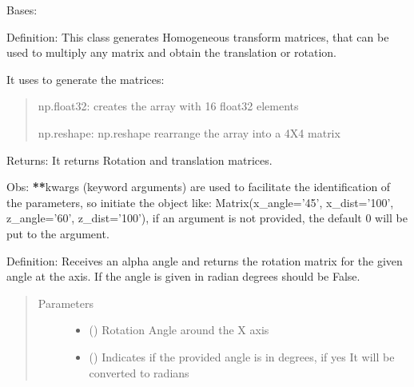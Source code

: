 \documentclass[letterpaper,10pt,english,openany,oneside]{sphinxmanual}
\begin{document}
\begin{fulllineitems}
\label{\detokenize{MatrixManipulation:MatrixManipulation.Matrix}}
Bases: 

Definition: This class generates Homogeneous transform matrices,
that can be used to multiply any matrix and obtain the translation or rotation.

It uses  to generate the matrices:
\begin{quote}

np.float32: creates the array with 16 float32 elements

np.reshape: np.reshape rearrange the array into a 4X4 matrix
\end{quote}

Returns: It returns Rotation and translation matrices.

Obs: {\color{red}\bfseries{}**}kwargs (keyword arguments) are used to facilitate the identification of the parameters, so initiate the
object
like: Matrix(x\_angle=’45’, x\_dist=’100’, z\_angle=’60’, z\_dist=’100’), if an argument is not provided,
the default 0 will be put to the argument.

\begin{fulllineitems}
\label{\detokenize{MatrixManipulation:MatrixManipulation.Matrix.rot_x}}
Definition: Receives an alpha angle and returns the rotation matrix for the given angle at the  axis.
If the angle is given in radian degrees should be False.
\begin{quote}\begin{description}
\item[{Parameters}] \leavevmode\begin{itemize}
\item {} 
 () \textendash{} Rotation Angle around the X axis

\item {} 
 () \textendash{} Indicates if the provided angle is in degrees, if yes It will be converted to radians


\end{itemize}
\end{description}
\end{quote}
\end{fulllineitems}
\end{fulllineitems}
\end{document}
